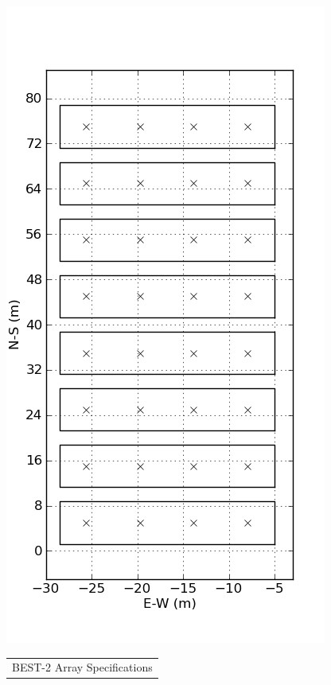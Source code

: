 \documentclass[useAMS,macros,usenatbib,onecolumn]{mn2e}
\begin{document}
\begin{figure}
  \begin{minipage}[c]{0.475\textwidth}
      \centering
      \includegraphics[scale=0.7]{graphics/layout.png}
  \end{minipage}
  \hspace{0.05\textwidth}
  \begin{minipage}[c]{0.475\textwidth}
      \centering
      \begin{tabular}{| l | l | l |}
      \hline
      \multicolumn{3}{|c|}{BEST-2 Array Specifications}\\

\end{tabular}
\end{minipage}
\end{figure}
\end{document}
